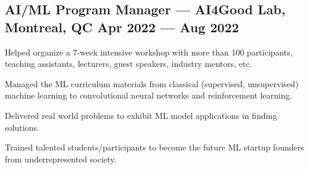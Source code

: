 \documentclass[letter,11pt]{article}
\begin{document}
\subsection{AI/ML Program Manager --- AI4Good Lab, Montreal, QC \hfill Apr 2022 --- Aug 2022}
\begin{zitemize}
	\item Helped organize a 7-week intensive workshop with more than 100 participants, teaching assistants, lecturers, guest speakers, industry mentors, etc.
	\item Managed the ML curriculum materials from classical (supervised, unsupervised) machine learning to convolutional neural networks and reinforcement learning.
	\item Delivered real world problems to exhibit ML model applications in finding solutions.
	\item Trained talented students/participants to become the future ML startup founders from underrepresented society.
\end{zitemize}
\end{document}
